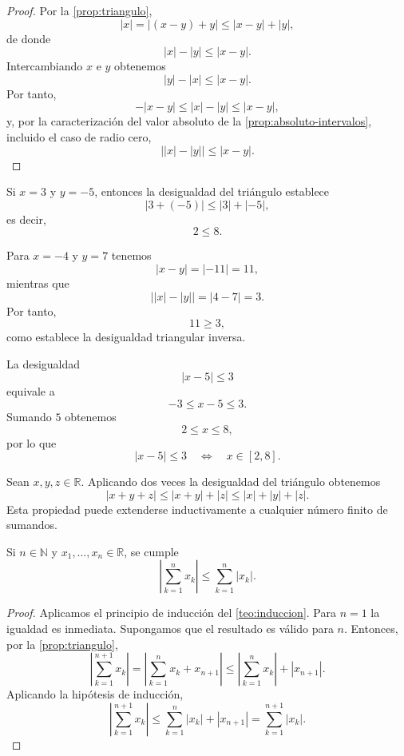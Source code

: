 \begin{proof}
Por la \cref{prop:triangulo},
\[
|x|=|(x-y)+y|\leq|x-y|+|y|,
\]
de donde
\[
|x|-|y|\leq|x-y|.
\]
Intercambiando $x$ e $y$ obtenemos
\[
|y|-|x|\leq|x-y|.
\]
Por tanto,
\[
-\lvert x-y\rvert\leq |x|-|y|\leq|x-y|,
\]
y, por la caracterización del valor absoluto de la \cref{prop:absoluto-intervalos}, incluido el caso de radio cero,
\[
\bigl||x|-|y|\bigr|\leq|x-y|.
\]
\end{proof}

\begin{example}
Si $x=3$ y $y=-5$, entonces la desigualdad del triángulo establece
\[
|3+(-5)|\leq|3|+|-5|,
\]
es decir,
\[
2\leq8.
\]
\end{example}

\begin{example}
Para $x=-4$ y $y=7$ tenemos
\[
|x-y|=|-11|=11,
\]
mientras que
\[
\bigl||x|-|y|\bigr|=|4-7|=3.
\]
Por tanto,
\[
11\geq3,
\]
como establece la desigualdad triangular inversa.
\end{example}

\begin{example}
La desigualdad
\[
|x-5|\leq3
\]
equivale a
\[
-3\leq x-5\leq3.
\]
Sumando $5$ obtenemos
\[
2\leq x\leq8,
\]
por lo que
\[
|x-5|\leq3
\quad\Longleftrightarrow\quad
x\in[2,8].
\]
\end{example}

\begin{example}
Sean $x,y,z\in\mathbb{R}$. Aplicando dos veces la desigualdad del triángulo obtenemos
\[
|x+y+z|\leq |x+y|+|z|
\leq |x|+|y|+|z|.
\]
Esta propiedad puede extenderse inductivamente a cualquier número finito de sumandos.
\end{example}

\begin{samepage}
\begin{proposition}
\label{prop:triangulo-finita}
Si $n\in\mathbb{N}$ y $x_1,\ldots,x_n\in\mathbb{R}$, se cumple
\[
\left|\sum_{k=1}^{n}x_k\right|
\leq
\sum_{k=1}^{n}|x_k|.
\]
\end{proposition}
\end{samepage}

\begin{proof}
Aplicamos el principio de inducción del \cref{teo:induccion}. Para $n=1$ la igualdad es inmediata. Supongamos que el resultado es válido para $n$. Entonces, por la \cref{prop:triangulo},
\[
\left|\sum_{k=1}^{n+1}x_k\right|
=
\left|\sum_{k=1}^{n}x_k+x_{n+1}\right|
\leq
\left|\sum_{k=1}^{n}x_k\right|+|x_{n+1}|.
\]
Aplicando la hipótesis de inducción,
\[
\left|\sum_{k=1}^{n+1}x_k\right|
\leq
\sum_{k=1}^{n}|x_k|+|x_{n+1}|
=
\sum_{k=1}^{n+1}|x_k|.
\]
\end{proof}

